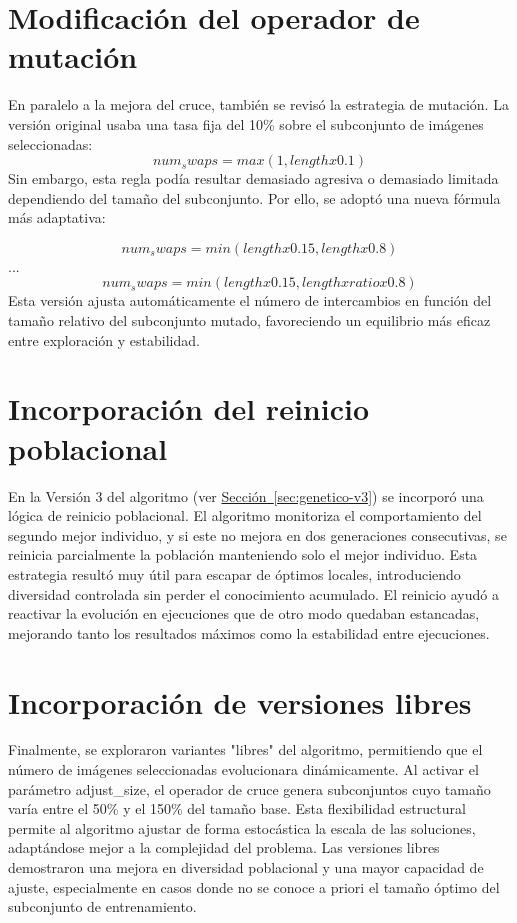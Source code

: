 \section{Modificación del operador de mutación}\label{sec:modificacion-mutacion}
En paralelo a la mejora del cruce, también se revisó la estrategia de mutación.
La versión original usaba una tasa fija del 10\% sobre el subconjunto de imágenes seleccionadas:
$$
    num_swaps=max(1,lengthx0.1)
$$
Sin embargo, esta regla podía resultar demasiado agresiva o demasiado limitada dependiendo del tamaño del subconjunto.
Por ello, se adoptó una nueva fórmula más adaptativa:

$$
    num_swaps=min(lengthx0.15,lengthx0.8)
$$
...
$$
    num_swaps=min(lengthx0.15,lengthxratiox0.8)
$$
Esta versión ajusta automáticamente el número de intercambios en función del tamaño relativo del subconjunto mutado, favoreciendo un equilibrio más eficaz entre exploración y estabilidad.

\section{Incorporación del reinicio poblacional}\label{sec:incorporacion-reinicio-poblacional}
En la Versión 3 del algoritmo (ver \hyperref[sec:genetico-v3]{Sección~\ref*{sec:genetico-v3}}) se incorporó una lógica de reinicio poblacional.
El algoritmo monitoriza el comportamiento del segundo mejor individuo, y si este no mejora en dos generaciones consecutivas, se reinicia parcialmente la población manteniendo solo el mejor individuo.
Esta estrategia resultó muy útil para escapar de óptimos locales, introduciendo diversidad controlada sin perder el conocimiento acumulado.
El reinicio ayudó a reactivar la evolución en ejecuciones que de otro modo quedaban estancadas, mejorando tanto los resultados máximos como la estabilidad entre ejecuciones.

\section{Incorporación de versiones libres}\label{sec:incorporacion-versiones-libres}
Finalmente, se exploraron variantes "libres" del algoritmo, permitiendo que el número de imágenes seleccionadas evolucionara dinámicamente.
Al activar el parámetro adjust\_size, el operador de cruce genera subconjuntos cuyo tamaño varía entre el 50\% y el 150\% del tamaño base.
Esta flexibilidad estructural permite al algoritmo ajustar de forma estocástica la escala de las soluciones, adaptándose mejor a la complejidad del problema.
Las versiones libres demostraron una mejora en diversidad poblacional y una mayor capacidad de ajuste, especialmente en casos donde no se conoce a priori el tamaño óptimo del subconjunto de entrenamiento.

